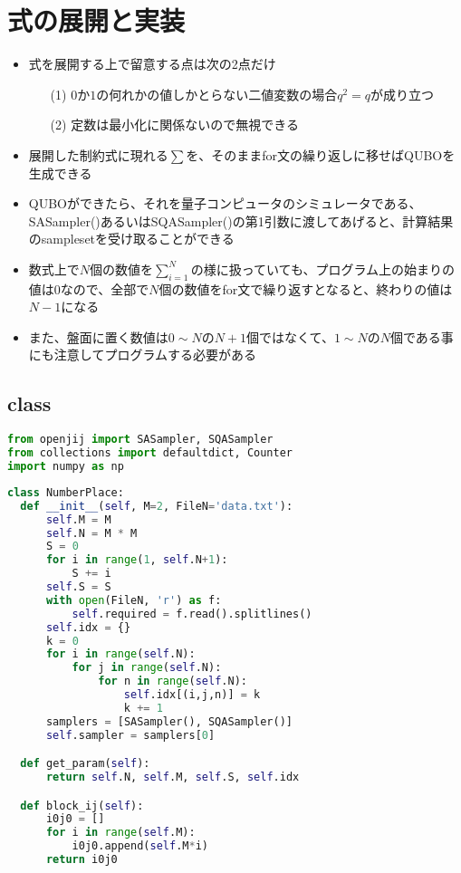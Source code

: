 \documentclass[uplatex,dvipdfmx,a4paper,11pt,oneside,openany]{jsbook}
\begin{document}
\section{式の展開と実装}

\begin{itemize}
\item 式を展開する上で留意する点は次の2点だけ
  \begin{itemize}
  \item[(1)] $0$か$1$の何れかの値しかとらない二値変数の場合$q^2=q$が成り立つ
  \item[(2)] 定数は最小化に関係ないので無視できる
  \end{itemize}
\item 展開した制約式に現れる$\sum$を、そのままfor文の繰り返しに移せばQUBOを生成できる
\item QUBOができたら、それを量子コンピュータのシミュレータである、SASampler()あるいはSQASampler()の第1引数に渡してあげると、計算結果のsamplesetを受け取ることができる
\item 数式上で$N$個の数値を$\sum_{i=1}^N$の様に扱っていても、プログラム上の始まりの値は$0$なので、全部で$N$個の数値をfor文で繰り返すとなると、終わりの値は$N-1$になる
\item また、盤面に置く数値は$0\sim N$の$N+1$個ではなくて、$1\sim N$の$N$個である事にも注意してプログラムする必要がある
\end{itemize}

\subsection{class}

\begin{lstlisting}[language=Python]
from openjij import SASampler, SQASampler
from collections import defaultdict, Counter
import numpy as np
\end{lstlisting}

\begin{lstlisting}[language=Python]
class NumberPlace:
  def __init__(self, M=2, FileN='data.txt'):
      self.M = M
      self.N = M * M
      S = 0
      for i in range(1, self.N+1):
          S += i
      self.S = S
      with open(FileN, 'r') as f:
          self.required = f.read().splitlines()
      self.idx = {}
      k = 0
      for i in range(self.N):
          for j in range(self.N):
              for n in range(self.N):
                  self.idx[(i,j,n)] = k
                  k += 1
      samplers = [SASampler(), SQASampler()]
      self.sampler = samplers[0]

  def get_param(self):
      return self.N, self.M, self.S, self.idx

  def block_ij(self):
      i0j0 = []
      for i in range(self.M):
          i0j0.append(self.M*i)
      return i0j0
\end{lstlisting}
\end{document}

